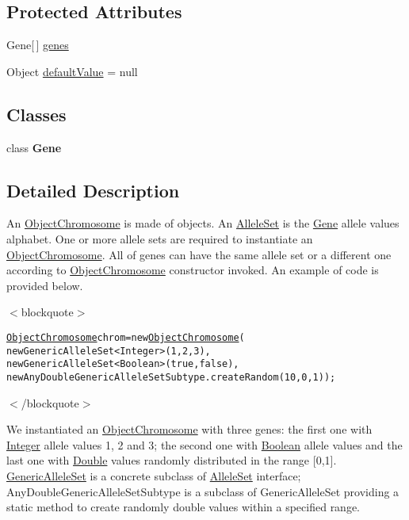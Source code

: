 \subsection*{Protected Attributes}
\begin{CompactItemize}
\item 
Gene\mbox{[}$\,$\mbox{]} \hyperlink{classjenes_1_1chromosome_1_1_object_chromosome_33bb9e1cc526fe8e4be0417bbd05a127}{genes}
\item 
Object \hyperlink{classjenes_1_1chromosome_1_1_object_chromosome_f5e2ac0b5272d948ec566f824baa3411}{defaultValue} = null
\end{CompactItemize}
\subsection*{Classes}
\begin{CompactItemize}
\item 
class \textbf{Gene}
\end{CompactItemize}


\subsection{Detailed Description}
An \hyperlink{classjenes_1_1chromosome_1_1_object_chromosome}{ObjectChromosome} is made of objects. An \hyperlink{}{AlleleSet} is the \hyperlink{}{Gene} allele values alphabet. One or more allele sets are required to instantiate an \hyperlink{classjenes_1_1chromosome_1_1_object_chromosome}{ObjectChromosome}. All of genes can have the same allele set or a different one according to \hyperlink{classjenes_1_1chromosome_1_1_object_chromosome}{ObjectChromosome} constructor invoked. An example of code is provided below. 

$<$blockquote$>$\small\begin{alltt}
 \hyperlink{classjenes_1_1chromosome_1_1_object_chromosome}{ObjectChromosome} chrom = new \hyperlink{classjenes_1_1chromosome_1_1_object_chromosome}{ObjectChromosome}(
 		new GenericAlleleSet<Integer>(1, 2, 3),
		new GenericAlleleSet<Boolean>(true, false),
 		new AnyDoubleGenericAlleleSetSubtype.createRandom(10, 0, 1)  );
 \end{alltt}
\normalsize 
$<$/blockquote$>$ 

We instantiated an \hyperlink{classjenes_1_1chromosome_1_1_object_chromosome}{ObjectChromosome} with three genes: the first one with \hyperlink{}{Integer} allele values 1, 2 and 3; the second one with \hyperlink{}{Boolean} allele values and the last one with \hyperlink{}{Double} values randomly distributed in the range \mbox{[}0,1\mbox{]}. \hyperlink{}{GenericAlleleSet} is a concrete subclass of \hyperlink{}{AlleleSet} interface; AnyDoubleGenericAlleleSetSubtype is a subclass of GenericAlleleSet providing a static method to create randomly double values within a specified range.

